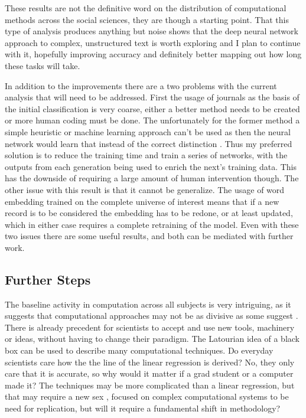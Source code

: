 \documentclass[12pt, a4paper]{article}
\begin{document}
These results are not the definitive word on the distribution of computational methods across the social sciences, they are though a starting point. That this type of analysis produces anything but noise shows that the deep neural network approach to complex, unstructured text is worth exploring and I plan to continue with it, hopefully improving accuracy and definitely better mapping out how long these tasks will take. 

In addition to the improvements there are a two problems with the current analysis that will need to be addressed. First the usage of journals as the basis of the initial classification is very coarse, either a better method needs to be created or more human coding must be done. The unfortunately for the former method a simple heuristic or machine learning approach can't be used as then the neural network would learn that instead of the correct distinction \citep{deep_learning_chapter12}. Thus my preferred solution is to reduce the training time and train a series of networks, with the outputs from each generation being used to enrich the next's training data. This has the downside of requiring  a large amount of human intervention though. The other issue with this result is that it cannot be generalize. The usage of word embedding trained on the complete universe of interest means that if a new record is to be considered the embedding has to be redone, or at least updated, which in either case requires a complete retraining of the model. Even with these two issues there are some useful results, and both can be mediated with further work.
\subsection{Further Steps}

The baseline activity in computation across all subjects is  very intriguing, as it suggests that computational approaches may not be as divisive as some suggest \citep{watts2007twenty}\citep{lazer2009life}. There is already precedent for scientists to accept and use new tools, machinery or ideas, without having to change their paradigm. The Latourian idea of a black box \citep{latour1987science} can be used to describe many computational techniques. Do everyday scientists care how the the line of the linear regression is derived? No, they only care that it is accurate, so why would it matter if a grad student or a computer made it? The techniques may be more complicated than a linear regression, but that may require a new sex \citep{collins1975seven}, focused on complex computational systems to be need for replication, but will it require a fundamental shift in methodology? 
\end{document}
